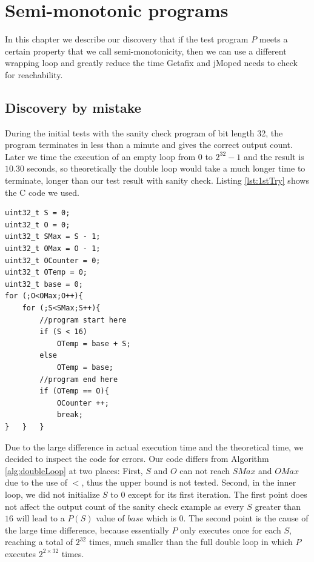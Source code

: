 \chapter{Semi-monotonic programs}
	\label{CH_03}

In this chapter we describe our discovery that if the test program $P$ meets a certain property that we call semi-monotonicity, then we can use a different wrapping loop and greatly reduce the time Getafix and jMoped needs to check for reachability.

\section{Discovery by mistake}
During the initial tests with the sanity check program of bit length 32, the program terminates in less than a minute and gives the correct output count. Later we time the execution of an empty loop from $0$ to $2^{32} - 1$ and the result is $10.30$ seconds, so theoretically the double loop would take a much longer time to terminate, longer than our test result with sanity check.  Listing \ref{lst:1stTry} shows the C code we used.

\lstset{language=C}  
\begin{lstlisting}[float=!h, caption={Initial implementation of the double loop with sanity check in C.},label=lst:1stTry]
uint32_t S = 0;
uint32_t O = 0;
uint32_t SMax = S - 1;
uint32_t OMax = O - 1;
uint32_t OCounter = 0;
uint32_t OTemp = 0;
uint32_t base = 0;
for (;O<OMax;O++){
	for (;S<SMax;S++){
		//program start here
		if (S < 16)
			OTemp = base + S;
		else
			OTemp = base;
		//program end here
		if (OTemp == O){
			OCounter ++;
			break;
}	}	}
\end{lstlisting}

Due to the large difference in actual execution time and the theoretical time, we decided to inspect the code for errors. Our code differs from Algorithm \ref{alg:doubleLoop} at two places: First, $S$ and $O$ can not reach $SMax$ and $OMax$ due to the use of $<$, thus the upper bound is not tested. Second, in the inner loop, we did not initialize $S$ to $0$ except for its first iteration. The first point does not affect the output count of the sanity check example as every $S$ greater than $16$ will lead to a $P(S)$ value of $base$ which is $0$. The second point is the cause of the large time difference, because essentially $P$ only executes once for each $S$, reaching a total of $2^{32}$ times, much smaller than the full double loop in which $P$ executes $2^{2 \times 32}$ times.

